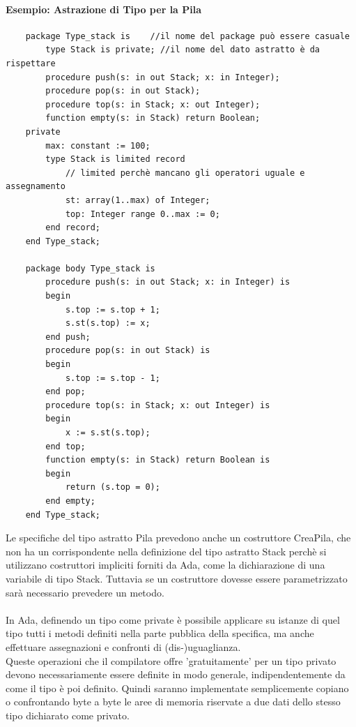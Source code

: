 \documentclass{article}
\begin{document}
	\paragraph*{Esempio: Astrazione di Tipo per la Pila}
	\begin{verbatim}
	package Type_stack is    //il nome del package può essere casuale
	    type Stack is private; //il nome del dato astratto è da rispettare
	    procedure push(s: in out Stack; x: in Integer);
	    procedure pop(s: in out Stack);
	    procedure top(s: in Stack; x: out Integer);
	    function empty(s: in Stack) return Boolean;
	private
	    max: constant := 100;
	    type Stack is limited record
			// limited perchè mancano gli operatori uguale e assegnamento
	        st: array(1..max) of Integer;
	        top: Integer range 0..max := 0;
	    end record;
	end Type_stack;

	package body Type_stack is
	    procedure push(s: in out Stack; x: in Integer) is
	    begin
	        s.top := s.top + 1;
	        s.st(s.top) := x;
	    end push;
	    procedure pop(s: in out Stack) is
	    begin
	        s.top := s.top - 1;
	    end pop;
	    procedure top(s: in Stack; x: out Integer) is
	    begin
	        x := s.st(s.top);
	    end top;
	    function empty(s: in Stack) return Boolean is
	    begin
	        return (s.top = 0);
	    end empty;
	end Type_stack;
	\end{verbatim}
	Le specifiche del tipo astratto Pila prevedono anche un costruttore CreaPila, che non ha un corrispondente nella definizione del tipo astratto Stack perchè si utilizzano costruttori impliciti forniti da Ada, come la dichiarazione di una variabile di tipo Stack. Tuttavia se un costruttore dovesse essere parametrizzato sarà necessario prevedere un metodo. \\
	\vspace{\baselineskip} \\
	In Ada, definendo un tipo come private è possibile applicare su istanze di quel tipo tutti i metodi definiti nella parte pubblica della specifica, ma anche effettuare assegnazioni e confronti di (dis-)uguaglianza. \\
	Queste operazioni che il compilatore offre 'gratuitamente' per un tipo privato devono necessariamente essere definite in modo generale, indipendentemente da come il tipo è poi definito. Quindi saranno implementate semplicemente copiano o confrontando byte a byte le aree di memoria riservate a due dati dello stesso tipo dichiarato come privato.
	\vspace{\baselineskip} \\
\end{document}
